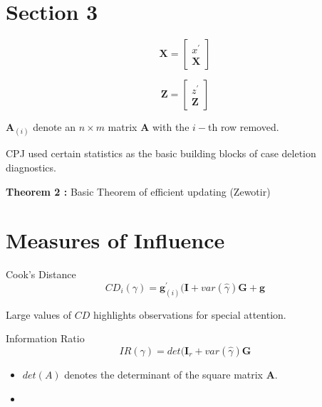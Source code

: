\documentclass[12pt, a4paper]{article}
\begin{document}
\section{Section 3}

\[  \boldsymbol{X} = \left[  \begin{array}{c} x^{\prime} \\ \boldsymbol{X} \end{array} \right]   \]

\[  \boldsymbol{Z} = \left[  \begin{array}{c} z^{\prime} \\ \boldsymbol{Z} \end{array} \right]   \] 

$\boldsymbol{A}_{(i)}$ denote an $n\times m$ matrix $\boldsymbol{A}$ with the $i-$th row removed.


CPJ used certain statistics as the basic building blocks of case deletion diagnostics.



\textbf{Theorem 2 :} Basic Theorem of efficient updating (Zewotir)

\section{Measures of Influence}

Cook's Distance
\[  CD_{i}(\gamma) = \boldsymbol{g}^{\prime}_{(i)} ( \boldsymbol{I} + var(\hat{\gamma}) \boldsymbol{G} + \boldsymbol{g}\]

Large values of $CD$ highlights observations for special attention.

Information Ratio
\[ IR(\gamma) = det( \boldsymbol{I}_r + var(\hat{\gamma})\boldsymbol{G} \]

\begin{itemize}
\item $det(A)$ denotes the determinant of the square matrix $\boldsymbol{A}$.
\item
\end{itemize}
\end{document}
